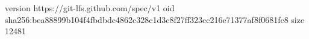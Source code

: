 version https://git-lfs.github.com/spec/v1
oid sha256:bea88899b104f4fbdbdc4862c328c1d3c8f27ff323cc216e71377af8f0681fc8
size 12481
